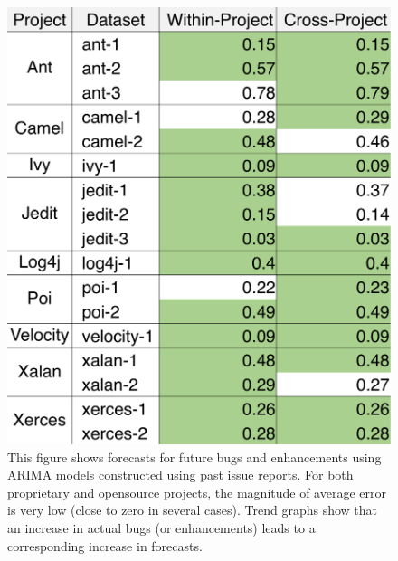 \begin{figure}[htbp]
\centering
\includegraphics[width=0.75\linewidth]{images/RQ4_5/RQ4_5.png}
\caption{This figure shows forecasts for future bugs and enhancements using ARIMA models constructed using past issue reports. For both proprietary and opensource projects, the magnitude of average error is very low (close to zero in several cases). Trend graphs show that an increase in actual bugs (or enhancements) leads to a corresponding increase in forecasts.}
\label{fig:rq4_5}
\end{figure}
